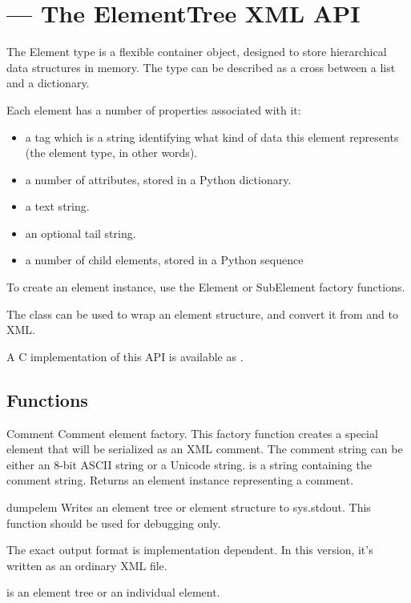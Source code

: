 \section{ --- The ElementTree XML API}


The Element type is a flexible container object, designed to store
hierarchical data structures in memory. The type can be described as a
cross between a list and a dictionary.

Each element has a number of properties associated with it:

\begin{itemize}
  \item a tag which is a string identifying what kind of data
        this element represents (the element type, in other words).
  \item a number of attributes, stored in a Python dictionary.
  \item a text string.
  \item an optional tail string.
  \item a number of child elements, stored in a Python sequence
\end{itemize}

To create an element instance, use the Element or SubElement factory
functions.

The  class can be used to wrap an element
structure, and convert it from and to XML.

A C implementation of this API is available as
.


\subsection{Functions\label{elementtree-functions}}

\begin{funcdesc}{Comment}{}
Comment element factory.  This factory function creates a special
element that will be serialized as an XML comment.
The comment string can be either an 8-bit ASCII string or a Unicode
string.
 is a string containing the comment string.
Returns an element instance representing a comment.
\end{funcdesc}

\begin{funcdesc}{dump}{elem}
Writes an element tree or element structure to sys.stdout.  This
function should be used for debugging only.

The exact output format is implementation dependent.  In this
version, it's written as an ordinary XML file.

 is an element tree or an individual element.
\end{funcdesc}

